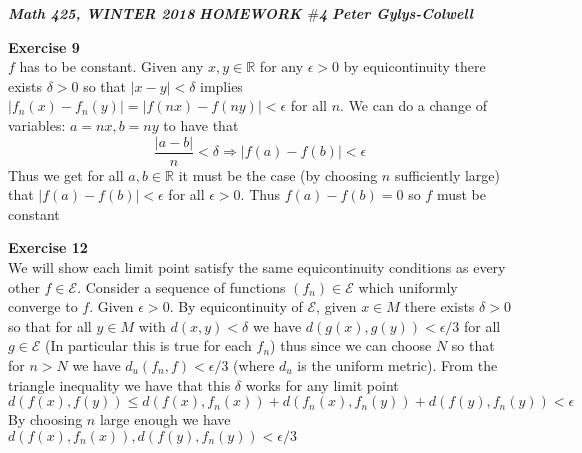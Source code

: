 \documentclass[12pt]{article}
\newenvironment{ques}[1]{\textbf{Exercise #1}\vspace{1 mm}\\ }{\bigskip}
\theoremstyle{definition}
\newcommand{\R}{\mathbb R}
\begin{document}
\noindent \textit{\textbf{Math 425, WINTER 2018}} \hspace{1.3cm}
\textit{\textbf{HOMEWORK $\#$4}} \hspace{1.3cm} \textit{\textbf{Peter
Gylys-Colwell}} 

\vspace{1cm}

\begin{ques}{9}
	$f$ has to be constant. Given any $x,y \in \R$ for any $\epsilon > 0$ by
	equicontinuity there exists $\delta > 0$ so that $|x - y| < \delta$ implies
	$|f_n(x) - f_n(y)| = |f(nx) - f(ny)| < \epsilon$ for all $n$. We can do a
	change of variables: $a = nx, b = ny$ to have that 
	$$\frac{|a - b|}{n} < \delta \Rightarrow |f(a) - f(b)| < \epsilon$$
	Thus we get for all $a,b \in \R$ it must be the case (by choosing $n$
	sufficiently large) that $|f(a) - f(b)| < \epsilon $ for all $\epsilon > 0$.
	Thus $f(a) - f(b) = 0$ so $f$ must be constant
\end{ques}

\begin{ques}{12}
	We will show each limit point satisfy the same equicontinuity conditions as
	every other $f \in \mathcal E$. Consider a sequence of functions $(f_n) \in
	\mathcal E$ which uniformly converge to $f$.  Given $\epsilon > 0$. By
	equicontinuity of $\mathcal E$, given $x \in M$ there exists $\delta > 0$
	so that for all $y \in M$ with $d(x,y) < \delta$ we have $d(g(x),g(y)) <
	\epsilon / 3$ for all $g\in \mathcal E$ (In particular this is true for
	each $f_n$) thus since we can choose $N$ so that for $n > N$ we have
	$d_u(f_n,f) < \epsilon / 3$ (where $d_u$ is the uniform metric). From the
	triangle inequality we have that this $\delta$ works for any limit point
	$$d(f(x),f(y)) \leq d(f(x),f_n(x)) + d(f_n(x),f_n(y)) + d(f(y),f_n(y)) <
	\epsilon$$
	By choosing $n$ large enough we have $d(f(x),f_n(x)),d(f(y),f_n(y)) < \epsilon / 3$
\end{ques}
\end{document}
